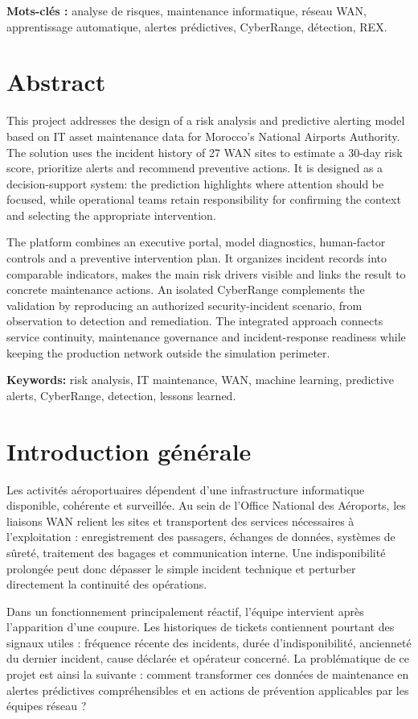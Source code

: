 \documentclass[12pt,a4paper,oneside]{report}
\newcommand{\frontchapter}[1]{%
  \chapter*{#1}%
  \addcontentsline{toc}{chapter}{#1}%
}
\begin{document}
\textbf{Mots-clés :} analyse de risques, maintenance informatique, réseau WAN, apprentissage automatique, alertes prédictives, CyberRange, détection, REX.

\frontchapter{Abstract}
This project addresses the design of a risk analysis and predictive alerting model based on IT asset maintenance data for Morocco’s National Airports Authority. The solution uses the incident history of 27 WAN sites to estimate a 30-day risk score, prioritize alerts and recommend preventive actions. It is designed as a decision-support system: the prediction highlights where attention should be focused, while operational teams retain responsibility for confirming the context and selecting the appropriate intervention.

The platform combines an executive portal, model diagnostics, human-factor controls and a preventive intervention plan. It organizes incident records into comparable indicators, makes the main risk drivers visible and links the result to concrete maintenance actions. An isolated CyberRange complements the validation by reproducing an authorized security-incident scenario, from observation to detection and remediation. The integrated approach connects service continuity, maintenance governance and incident-response readiness while keeping the production network outside the simulation perimeter.

\textbf{Keywords:} risk analysis, IT maintenance, WAN, machine learning, predictive alerts, CyberRange, detection, lessons learned.

\tableofcontents
\begingroup
\footnotesize
\setlength{\parskip}{0pt}
\setlength{\baselineskip}{9.5pt}
\listoffigures
\endgroup
\listoftables

\clearpage
{}
\setcounter{page}{1}

\frontchapter{Introduction générale}

Les activités aéroportuaires dépendent d’une infrastructure informatique disponible, cohérente et surveillée. Au sein de l’Office National des Aéroports, les liaisons WAN relient les sites et transportent des services nécessaires à l’exploitation : enregistrement des passagers, échanges de données, systèmes de sûreté, traitement des bagages et communication interne. Une indisponibilité prolongée peut donc dépasser le simple incident technique et perturber directement la continuité des opérations.

Dans un fonctionnement principalement réactif, l’équipe intervient après l’apparition d’une coupure. Les historiques de tickets contiennent pourtant des signaux utiles : fréquence récente des incidents, durée d’indisponibilité, ancienneté du dernier incident, cause déclarée et opérateur concerné. La problématique de ce projet est ainsi la suivante : comment transformer ces données de maintenance en alertes prédictives compréhensibles et en actions de prévention applicables par les équipes réseau ?
\end{document}
